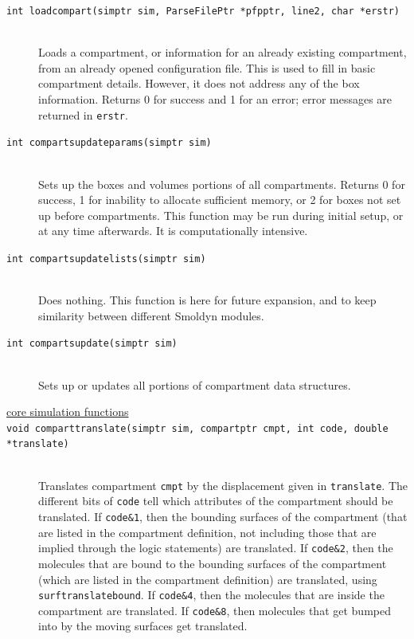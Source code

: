 \documentclass {scrbook}
\newcommand {\ttt} {\texttt}
\begin{document}
\begin{description}
\item[\ttt{int loadcompart(simptr sim, ParseFilePtr *pfpptr, line2, char *erstr)}]
\hfill \\
Loads a compartment, or information for an already existing compartment, from an already opened configuration file. This is used to fill in basic compartment details. However, it does not address any of the box information. Returns 0 for success and 1 for an error; error messages are returned in \ttt{erstr}.

\item[\ttt{int compartsupdateparams(simptr sim)}]
\hfill \\
Sets up the boxes and volumes portions of all compartments. Returns 0 for success, 1 for inability to allocate sufficient memory, or 2 for boxes not set up before compartments. This function may be run during initial setup, or at any time afterwards. It is computationally intensive.

\item[\ttt{int compartsupdatelists(simptr sim)}]
\hfill \\
Does nothing. This function is here for future expansion, and to keep similarity between different Smoldyn modules.

\item[\ttt{int compartsupdate(simptr sim)}]
\hfill \\
Sets up or updates all portions of compartment data structures.

\item[\underline{core simulation functions}]

\item[\ttt{void comparttranslate(simptr sim, compartptr cmpt, int code, double *translate)}]
\hfill \\
Translates compartment \ttt{cmpt} by the displacement given in \ttt{translate}. The different bits of \ttt{code} tell which attributes of the compartment should be translated. If \ttt{code\&1}, then the bounding surfaces of the compartment (that are listed in the compartment definition, not including those that are implied through the logic statements) are translated. If \ttt{code\&2}, then the molecules that are bound to the bounding surfaces of the compartment (which are listed in the compartment definition) are translated, using \ttt{surftranslatebound}. If \ttt{code\&4}, then the molecules that are inside the compartment are translated. If \ttt{code\&8}, then molecules that get bumped into by the moving surfaces get translated.


\end{description}
\end{document}
